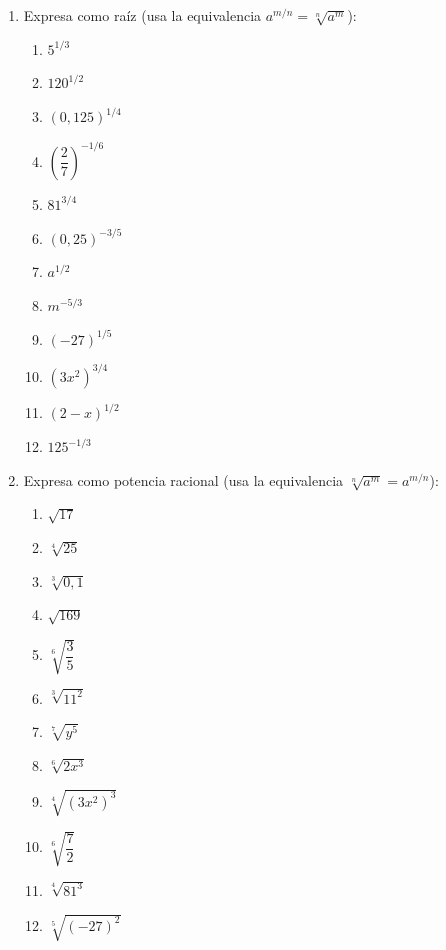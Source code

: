 \documentclass[11pt, letterpaper]{article}
\begin{document}
\begin{enumerate}[label=\textbf{\arabic*.}, leftmargin=*]
  \item Expresa como raíz (usa la equivalencia $a^{m/n} = \sqrt[n]{a^m}$):
  \begin{multicols}{3}
  \begin{enumerate}[label=\alph*)]
    \item $5^{1/3}$
    \item $120^{1/2}$
    \item $(0{,}125)^{1/4}$
    \item $\left(\dfrac{2}{7}\right)^{-1/6}$
    \item $81^{3/4}$
    \item $(0{,}25)^{-3/5}$
    \item $a^{1/2}$
    \item $m^{-5/3}$
    \item $(-27)^{1/5}$
    \item $(3x^2)^{3/4}$
    \item $(2-x)^{1/2}$
    \item $125^{-1/3}$
  \end{enumerate}
  \end{multicols}

  \item Expresa como potencia racional (usa la equivalencia $\sqrt[n]{a^m} = a^{m/n}$):
  \begin{multicols}{3}
  \begin{enumerate}[label=\alph*)]
    \item $\sqrt{17}$
    \item $\sqrt[4]{25}$
    \item $\sqrt[3]{0{,}1}$
    \item $\sqrt{169}$
    \item $\sqrt[6]{\dfrac{3}{5}}$
    \item $\sqrt[3]{11^2}$
    \item $\sqrt[7]{y^5}$
    \item $\sqrt[6]{2x^3}$
    \item $\sqrt[4]{(3x^2)^3}$
    \item $\sqrt[6]{\dfrac{7}{2}}$
    \item $\sqrt[4]{81^3}$
    \item $\sqrt[5]{(-27)^2}$
  \end{enumerate}
  \end{multicols}


\end{enumerate}
\end{document}
